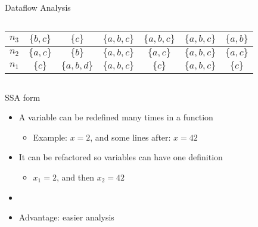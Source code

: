 \begin{frame}{Dataflow Analysis}
\begin{columns}[c]
{\begin{tabular}{|c|c|c|c|c|c|c|}
$n_3$                   & $\{b, c\}$                   & $\{c\}      $            & $\{a, b, c\}$     & $\{a, b, c\}$    & $\{a, b, c\}$     & $\{a, b\}   $    \\ \hline
$n_2$                   & $\{a, c\}$                   & $\{b\}      $            & $\{a, b, c\}$     & $\{a, c\}   $    & $\{a, b, c\}$     & $\{a, c\}   $    \\ \hline
$n_1$                   & $\{c\}   $                   & $\{a, b, d\}$            & $\{a, b, c\}$     & $\{c\}      $    & $\{a, b, c\}$     & $\{c\}      $    \\ \hline

\end{tabular}
} %
\end{columns}

\end{frame}


\begin{frame}{SSA form}

\begin{itemize}
    \item A variable can be redefined many times in a function
    \begin{itemize}
        \item Example: $x = 2$, and some lines after: $x = 42$
    \end{itemize}
    \item It can be refactored so variables can have one definition
    \begin{itemize}
        \item $x_1 = 2$, and then $x_2 = 42$
    \end{itemize}
    \item[]
    \item Advantage: easier analysis
\end{itemize}

\end{frame}



